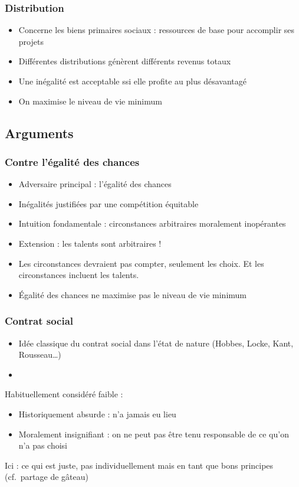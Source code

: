 \documentclass[french]{beamer}
\begin{document}
\begin{frame}
	\frametitle{Distribution}
	\begin{itemize}
		\item Concerne les biens primaires sociaux : ressources de base pour accomplir ses projets
		\item Différentes distributions génèrent différents revenus totaux
    \item Une inégalité est acceptable ssi elle profite au plus désavantagé
    \item On maximise le niveau de vie minimum
	\end{itemize}
\end{frame}

\subsection{Arguments}
\begin{frame}
	\frametitle{Contre l’égalité des chances}
	\begin{itemize}
		\item Adversaire principal : l’égalité des chances
		\item Inégalités justifiées par une compétition équitable
		\item Intuition fondamentale : circonstances arbitraires moralement inopérantes
		\item Extension : les talents sont arbitraires !
		\item Les circonstances devraient pas compter, seulement les choix. Et les circonstances incluent les talents.
		\item Égalité des chances ne maximise pas le niveau de vie minimum
	\end{itemize}
\end{frame}

\begin{frame}
	\frametitle{Contrat social}
	\begin{itemize}
		\item Idée classique du contrat social dans l’état de nature (Hobbes, Locke, Kant, Rousseau…)
		\item 
	\end{itemize}
  Habituellement considéré faible :
	\begin{itemize}
		\item Historiquement absurde : n’a jamais eu lieu
		\item Moralement insignifiant : on ne peut pas être tenu responsable de ce qu’on n’a pas choisi
	\end{itemize}
  Ici : ce qui est juste, pas individuellement mais en tant que bons principes (cf.\ partage de gâteau)
\end{frame}
\end{document}
